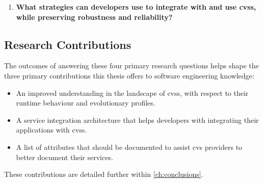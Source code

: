 \begin{leftbar}
\begin{enumerate}[label=\faQuestionCircle~~\textbf{RQ\arabic*.}, ref=RQ\arabic*, leftmargin=2.75\parindent, rightmargin=1\parindent,start=4]
  \item \textbf{What strategies can developers use to integrate with and use \glspl{cvs}, while preserving robustness and reliability?}\label{rq:ase}%
\end{enumerate}
\end{leftbar}



\subsection{Research Contributions}



The outcomes of answering these four primary research questions helps shape the three primary contributions this thesis offers to software engineering knowledge:

\begin{itemize}
  \item An improved understanding in the landscape of \glspl{cvs}, with respect to their runtime behaviour and evolutionary profiles.
  \item A service integration architecture that helps developers with integrating their applications with \glspl{cvs}.
  \item A list of attributes that should be documented to assist \gls{cvs} providers to better document their services.
\end{itemize}

\noindent
These contributions are detailed further within \cref{ch:conclusions}.

